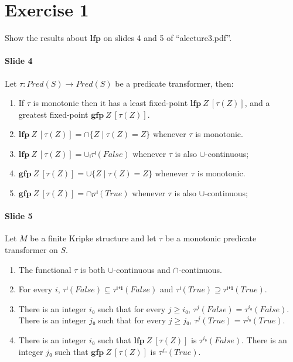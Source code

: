 \documentclass[a4paper, 12pt]{article}
\begin{document}



\section{Exercise 1}

\newcommand{\LFP}{\mathbf{lfp}~Z~[τ(Z)]}
\newcommand{\GFP}{\mathbf{gfp}~Z~[τ(Z)]}

Show the results about $\mathbf{lfp}$ on slides 4 and 5 of “alecture3.pdf”.

\paragraph{Slide 4}

Let $τ: Pred(S) → Pred(S)$ be a predicate transformer, then:

\begin{enumerate}

    \item If $τ$ is monotonic then it has a least fixed-point $\LFP$, and a greatest fixed-point $\GFP$.

    \item $\LFP = ∩\{ Z ∣ τ(Z) = Z \}$ whenever $τ$ is monotonic.

    \item $\LFP = ∪ᵢτⁱ(False)$ whenever $τ$ is also $∪$-continuous;

    \item $\GFP = ∪\{ Z ∣ τ(Z) = Z \}$ whenever $τ$ is monotonic.

    \item $\GFP = ∩ᵢτⁱ(True)$ whenever $τ$ is also $∪$-continuous;

\end{enumerate}

\paragraph{Slide 5}

Let $M$ be a finite Kripke structure and let $τ$ be a monotonic predicate transformer on $S$.

\begin{enumerate}

    \item The functional $τ$ is both $∪$-continuous and $∩$-continuous.

    \item For every $i$, $τⁱ(False) ⊆ τⁱ⁺¹(False)$ and $τⁱ(True) ⊇ τⁱ⁺¹(True)$.

    \item There is an integer $i₀$ such that for every $j≥i₀$, $τ^j(False) = τ^{i₀}(False)$. There is an integer $j₀$ such that for every $j≥j₀$, $τ^j(True) = τ^{j₀}(True)$.

    \item There is an integer $i₀$ such that $\LFP$ is $τ^{i₀}(False)$. There is an integer $j₀$ such that $\GFP$ is $τ^{j₀}(True)$.

\end{enumerate}
\end{document}
